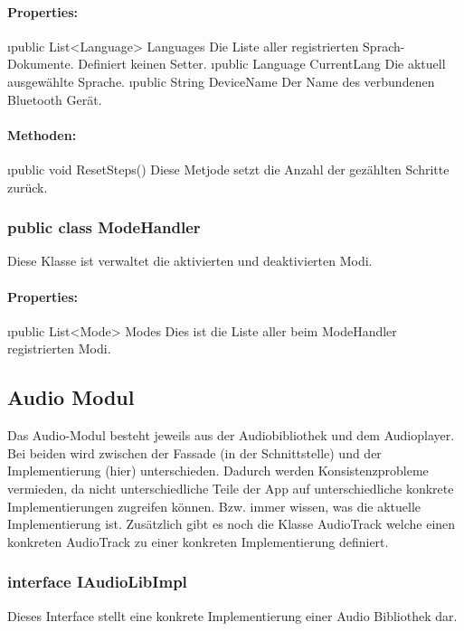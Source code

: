 \documentclass[../entwurf.tex]{subfiles}
\begin{document}
				\paragraph{Properties:}
					\begin{itemize}
						\i{public List<Language> Languages} Die Liste aller registrierten Sprach-Dokumente. Definiert keinen Setter.
						\i{public Language CurrentLang} Die aktuell ausgewählte Sprache.
						\i{public String DeviceName} Der Name des verbundenen Bluetooth Gerät.
					\end{itemize}
				\paragraph{Methoden:}
					\begin{itemize}
						\i{public void ResetSteps()} Diese Metjode setzt die Anzahl der gezählten Schritte zurück.
					\end{itemize}
			\subsubsection{public class ModeHandler}
				Diese Klasse ist verwaltet die aktivierten und deaktivierten Modi.
				\paragraph{Properties:}
					\begin{itemize}
						\i{public List<Mode> Modes} Dies ist die Liste aller beim ModeHandler registrierten Modi.
					\end{itemize}
		\subsection{Audio Modul}
			Das Audio-Modul besteht jeweils aus der Audiobibliothek und dem Audioplayer.
			Bei beiden wird zwischen der Fassade (in der Schnittstelle) und der Implementierung (hier) unterschieden.
			Dadurch werden Konsistenzprobleme vermieden, da nicht unterschiedliche Teile der App auf unterschiedliche konkrete Implementierungen
			zugreifen können. Bzw. immer wissen, was die aktuelle Implementierung ist.
			Zusätzlich gibt es noch die Klasse AudioTrack welche einen konkreten AudioTrack zu einer konkreten Implementierung definiert.
			\subsubsection{interface IAudioLibImpl}
				Dieses Interface stellt eine konkrete Implementierung einer Audio Bibliothek dar.
\end{document}
